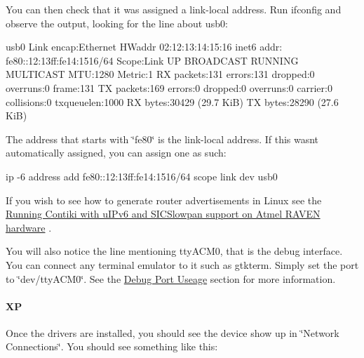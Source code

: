 

You can then check that it was assigned a link-\/local address. Run \textquotesingle{}ifconfig\textquotesingle{} and observe the output, looking for the line about usb0\+:

\begin{DoxyVerb}usb0      Link encap:Ethernet  HWaddr 02:12:13:14:15:16
          inet6 addr: fe80::12:13ff:fe14:1516/64 Scope:Link
          UP BROADCAST RUNNING MULTICAST  MTU:1280  Metric:1
          RX packets:131 errors:131 dropped:0 overruns:0 frame:131
          TX packets:169 errors:0 dropped:0 overruns:0 carrier:0
          collisions:0 txqueuelen:1000
          RX bytes:30429 (29.7 KiB)  TX bytes:28290 (27.6 KiB)
\end{DoxyVerb}


The address that starts with \char`\"{}fe80\char`\"{} is the link-\/local address. If this wasn\textquotesingle{}t automatically assigned, you can assign one as such\+:

\begin{DoxyVerb}ip -6 address add fe80::12:13ff:fe14:1516/64 scope link dev usb0
\end{DoxyVerb}


If you wish to see how to generate router advertisements in Linux see the \hyperlink{a00072}{Running Contiki with u\+I\+Pv6 and S\+I\+C\+Slowpan support on Atmel R\+A\+V\+EN hardware} .

You will also notice the line mentioning tty\+A\+C\+M0, that is the \textquotesingle{}debug\textquotesingle{} interface. You can connect any terminal emulator to it such as gtkterm. Simply set the port to \char`\"{}dev/tty\+A\+C\+M0\char`\"{}. See the \hyperlink{a00067_DebugPort}{Debug Port Useage} section for more information.\hypertarget{a00067_Windows}{}\paragraph{XP}\label{a00067_Windows}
Once the drivers are installed, you should see the device show up in \char`\"{}\+Network Connections\char`\"{}. You should see something like this\+:



